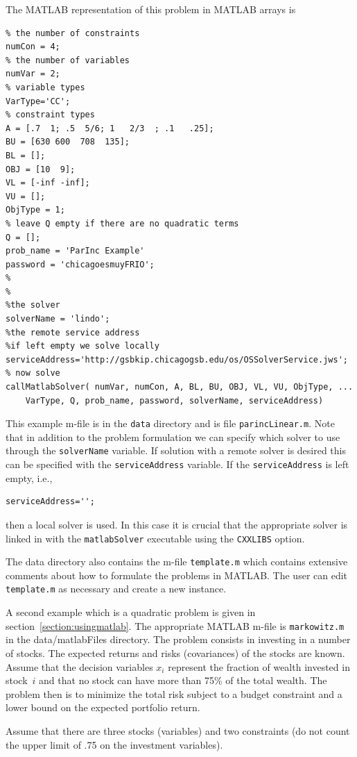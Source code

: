 \documentclass[11pt]{article}
\renewcommand{\_}{{\char"5F}}
\renewcommand{\{}{{\char"7B}}
\renewcommand{\}}{{\char"7D}}
\renewcommand{\^}{{\char"0D}}
\renewcommand{\'}{{\char"0D}}
\begin{document}
\begin{enumerate}[Step 1:]
The MATLAB representation of this problem in MATLAB arrays is
\begin{verbatim}
% the number of constraints
numCon = 4;
% the number of variables
numVar = 2;
% variable types
VarType='CC';
% constraint types
A = [.7  1; .5  5/6; 1   2/3  ; .1   .25];
BU = [630 600  708  135];
BL = [];
OBJ = [10  9];
VL = [-inf -inf];
VU = [];
ObjType = 1;
% leave Q empty if there are no quadratic terms
Q = [];
prob_name = 'ParInc Example'
password = 'chicagoesmuyFRIO';
%
%
%the solver
solverName = 'lindo';
%the remote service address
%if left empty we solve locally
serviceAddress='http://gsbkip.chicagogsb.edu/os/OSSolverService.jws';
% now solve
callMatlabSolver( numVar, numCon, A, BL, BU, OBJ, VL, VU, ObjType, ...
    VarType, Q, prob_name, password, solverName, serviceAddress)
\end{verbatim}
This example m-file is in the {\tt data} directory and is file {\tt parincLinear.m}. Note that in addition to the problem formulation
we can specify which solver to use through the {\tt solverName} variable.  If solution with a remote solver is desired
this can be specified with the {\tt serviceAddress} variable.  If the {\tt serviceAddress} is left empty, i.e.,
\begin{verbatim}
serviceAddress='';
\end{verbatim}
then a local solver is used. In this case  it is crucial that the appropriate solver is linked in with the {\tt matlabSolver}
executable using the {\tt CXXLIBS} option.


The data directory  also contains the m-file  {\tt template.m} which contains extensive comments about how to formulate
the problems in MATLAB.   The user can edit {\tt template.m} as necessary and create a new instance.




 A second example which is a quadratic problem is given in section~\ref{section:usingmatlab}.
The appropriate MATLAB m-file is {\tt markowitz.m} in the {data/matlabFiles} directory.
The problem consists in investing  in a number of stocks. The expected returns and risks
(covariances) of the stocks are known. Assume that the decision variables $x_i$
represent the fraction of wealth invested in stock~$i$ and that no stock can have
more than 75\% of the total wealth. The problem then is to minimize the total risk
subject to a budget constraint and a lower bound on the expected portfolio return.

Assume that there are three stocks (variables) and two constraints (do not count the upper limit  %
of .75 on the investment variables).



\end{enumerate}
\end{document}
